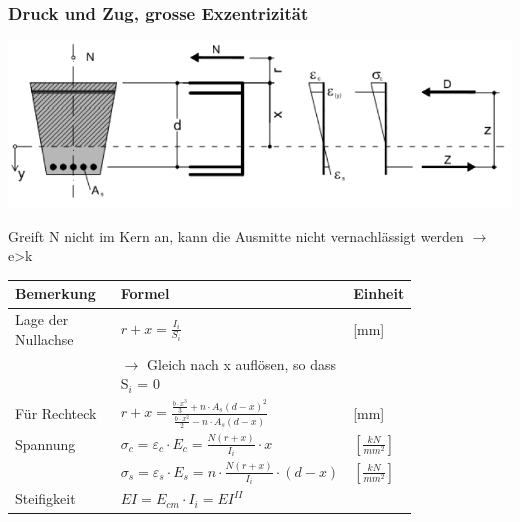\begin{multicols}{2}
	
	
	\subsubsection{Druck und Zug, grosse Exzentrizität}
	
	
	\includegraphics[width=\linewidth]{images/Risse7grEx.PNG}
	
	Greift N nicht im Kern an, kann die Ausmitte nicht vernachlässigt werden $ \rightarrow $ e>k
	
	\begin{tabular}{p{0.3\linewidth}|p{0.5\linewidth}|l}
		
		Bemerkung		& Formel		& Einheit \\ \hline
		
		
		Lage der Nullachse & $ r + x = \frac{I_i}{S_i} $	& [mm] \\
			&  $ \rightarrow $ Gleich nach x auflösen, so dass S$_i$ = 0	& 	\\		
		
		Für Rechteck	& $ r + x = \frac{  \frac{b \cdot x^3}{3}  + n \cdot A_s ( d - x )^2  }{  \frac{b \cdot x^2}{2} - n \cdot A_s ( d -  x )  } $	&	[mm] \\
		
		Spannung		& $ \sigma_c = \varepsilon_c \cdot E_c = \frac{ N ( r + x ) }{I_i} \cdot x $	& $ \left[ \frac{kN}{mm^2}\right] $ \\
		& $ \sigma_s = \varepsilon_s \cdot E_s = n \cdot \frac{ N ( r + x ) }{I_i} \cdot (d - x) $	& $ \left[ \frac{kN}{mm^2}\right] $ \\	
		Steifigkeit		& $ EI = E_{cm} \cdot I_i = EI^{II} $	&	\\
		
	\end{tabular}
	
	
\end{multicols}